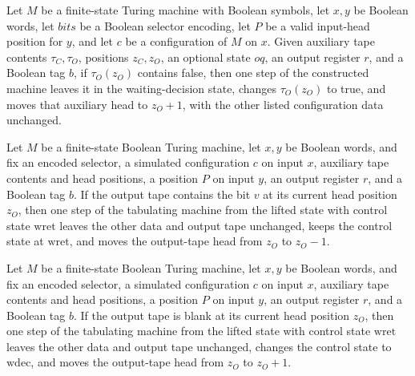 \begin{theorem}
\label{Complexity.Meyer.wdec_zero}
\leanok
{}
Let $M$ be a finite-state Turing machine with Boolean symbols, let $x,y$ be Boolean
words, let $bits$ be a Boolean selector encoding, let $P$ be a valid input-head position
for $y$, and let $c$ be a configuration of $M$ on $x$. Given auxiliary tape contents
$\tau_C,\tau_O$, positions $z_C,z_O$, an optional state $oq$, an output register $r$,
and a Boolean tag $b$, if $\tau_O(z_O)$ contains false, then one step of the constructed
machine leaves it in the waiting-decision state, changes $\tau_O(z_O)$ to true, and
moves that auxiliary head to $z_O+1$, with the other listed configuration data
unchanged.
\end{theorem}

\begin{theorem}
\label{Complexity.Meyer.wret_some}
\leanok
{}
Let $M$ be a finite-state Boolean Turing machine, let $x,y$ be Boolean words, and fix an
encoded selector, a simulated configuration $c$ on input $x$, auxiliary tape contents
and head positions, a position $P$ on input $y$, an output register $r$, and a Boolean
tag $b$. If the output tape contains the bit $v$ at its current head position $z_O$,
then one step of the tabulating machine from the lifted state with control state
$\mathrm{wret}$ leaves the other data and output tape unchanged, keeps the control state
at $\mathrm{wret}$, and moves the output-tape head from $z_O$ to $z_O-1$.
\end{theorem}

\begin{theorem}
\label{Complexity.Meyer.wret_none}
\leanok
{}
Let $M$ be a finite-state Boolean Turing machine, let $x,y$ be Boolean words, and fix an
encoded selector, a simulated configuration $c$ on input $x$, auxiliary tape contents
and head positions, a position $P$ on input $y$, an output register $r$, and a Boolean
tag $b$. If the output tape is blank at its current head position $z_O$, then one step
of the tabulating machine from the lifted state with control state $\mathrm{wret}$
leaves the other data and output tape unchanged, changes the control state to
$\mathrm{wdec}$, and moves the output-tape head from $z_O$ to $z_O+1$.
\end{theorem}

